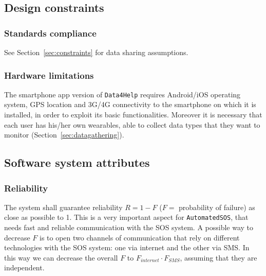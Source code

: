   \subsection{Design constraints}

    \subsubsection{Standards compliance}

      See Section~\ref{sec:constraints} for data sharing assumptions.

    \subsubsection{Hardware limitations}

      The smartphone app version of \texttt{Data4Help} requires Android/iOS operating system, GPS location and 3G/4G connectivity to the smartphone on which it is installed, in order to exploit its basic functionalities. Moreover it is necessary that each user has his/her own wearables, able to collect data types that they want to monitor (Section~\ref{sec:datagathering}).


  \subsection{Software system attributes}

    \subsubsection{Reliability}
    \label{sec:reliability}

      The system shall guarantee reliability $R = 1 - F$ ($F =$ probability of failure) as close as possible to 1. This is a very important aspect for \texttt{AutomatedSOS}, that needs fast and reliable communication with the SOS system. A possible way to decrease $F$ is to open two channels of communication that rely on different technologies with the SOS system: one via internet and the other via SMS. In this way we can decrease the overall $F$ to $F_{internet} \cdot F_{SMS}$, assuming that they are independent.


